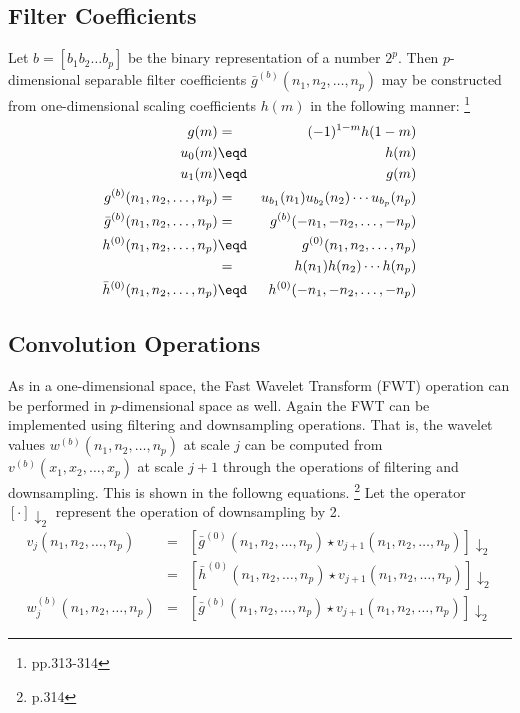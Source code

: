 \subsection {Filter Coefficients}
Let $b=[b_{1} b_{2} \ldots b_p ]$ be the binary representation of a number
$2^p$.
Then $p$-dimensional separable filter coefficients 
$\bar{g}^{(b)}(n_1, n_2, \ldots, n_p)$
may be constructed
from one-dimensional scaling coefficients $h(m)$ in the following
manner:
\footnote{\cite{mallat} pp.313-314}
   \begin{eqnarray}
      g(m)       &=&      (-1)^{1-m}h(1-m) \\
      u_0(m)     &\eqd& h(m)  \\ 
      u_1(m)     &\eqd& g(m)  \\ 
      g^{(b)}(n_1, n_2, \ldots, n_p)       &=&      u_{b_1}(n_1) u_{b_2}(n_2) \cdots u_{b_p}(n_p)  \\
      \bar{g}^{(b)}(n_1, n_2, \ldots, n_p) &=&      g^{(b)}(-n_1, -n_2, \ldots, -n_p)  \\
      h^{(0)}(n_1, n_2, \ldots, n_p)       
         &\eqd& g^{(0)}(n_1, n_2, \ldots, n_p)   \\
         &=&      h(n_1) h(n_2) \cdots h(n_p)      \\
      \bar{h}^{(0)}(n_1, n_2, \ldots, n_p) &\eqd& h^{(0)}(-n_1, -n_2, \ldots, -n_p)  
   \end{eqnarray}

\subsection {Convolution Operations}
As in a one-dimensional space, the Fast Wavelet Transform (FWT) operation
can be performed in $p$-dimensional space as well.
Again the FWT can be implemented using filtering and downsampling operations.
That is, the wavelet values $w^{(b)}(n_1, n_2, \ldots, n_p)$ at scale $j$
can be computed from $v^{(b)}(x_1, x_2, \ldots, x_p)$ at scale $j+1$
through the operations of filtering and downsampling.  This is shown in the 
followng equations.
\footnote{\cite{mallat} p.314}
Let the operator $[\cdot]\downarrow_2$ represent the operation of downsampling by 2.
   \begin{eqnarray}
      v_j(n_1, n_2, \ldots, n_p) 
         &=& \left[
             \bar{g}^{(0)}(n_1, n_2, \ldots, n_p) \star v_{j+1}(n_1, n_2, \ldots, n_p)
             \right]\downarrow_2 \\
         &=& \left[
             \bar{h}^{(0)}(n_1, n_2, \ldots, n_p) \star v_{j+1}(n_1, n_2, \ldots, n_p)
             \right]\downarrow_2 \\
      w_j^{(b)}(n_1, n_2, \ldots, n_p) 
         &=& \left[ 
         \bar{g}^{(b)}(n_1, n_2, \ldots, n_p) \star v_{j+1}(n_1, n_2, \ldots, n_p)
            \right]\downarrow_2 
   \end{eqnarray}


